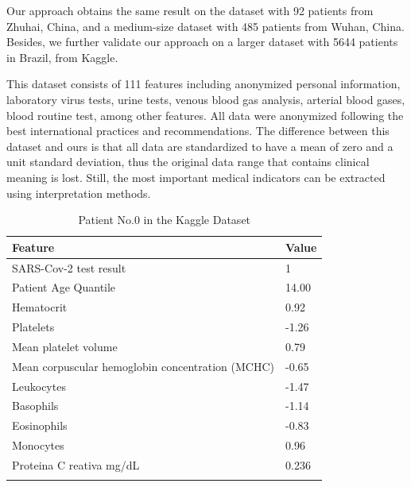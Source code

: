 Our approach obtains the same result on the dataset with 92 patients from Zhuhai, China, and a medium-size dataset with 485 patients from Wuhan, China. Besides, we further validate our approach on a larger dataset with 5644 patients in Brazil, from Kaggle.

This dataset consists of 111 features including anonymized personal information, laboratory virus tests, urine tests, venous blood gas analysis, arterial blood gases, blood routine test, among other features. All data were anonymized following the best international practices and recommendations. The difference between this dataset and ours is that all data are standardized to have a mean of zero and a unit standard deviation, thus the original data range that contains clinical meaning is lost. Still, the most important medical indicators can be extracted using interpretation methods.

\begin{table}[H]
\centering
\begin{tabular}{@{}ll@{}}
\toprule
Feature & Value\\ 
\midrule
SARS-Cov-2 test result & 1 \\
Patient Age Quantile & 14.00\\
Hematocrit  & 0.92\\
Platelets  & -1.26\\ 
Mean platelet volume  & 0.79\\ 
Mean corpuscular hemoglobin concentration (MCHC)  & -0.65\\
Leukocytes & -1.47\\
Basophils  & -1.14\\
Eosinophils & -0.83\\
Monocytes & 0.96\\  
Proteina C reativa mg/dL & 0.236\\ 
\bottomrule
\label{tab:kaggle}
\end{tabular}
\caption{Patient No.0 in the Kaggle Dataset}
\end{table}

